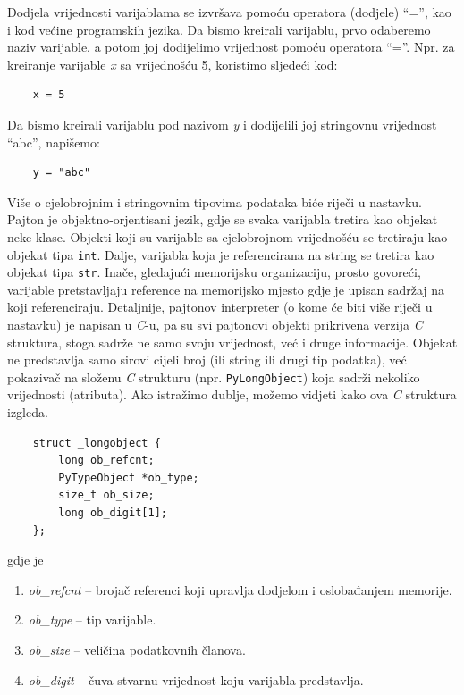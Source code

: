 Dodjela vrijednosti varijablama se izvršava pomoću operatora (dodjele) ``='', kao i kod većine programskih jezika. Da bismo kreirali varijablu, prvo odaberemo naziv varijable, a potom joj dodijelimo vrijednost pomoću operatora ``=''. Npr. za kreiranje varijable \textit{x} sa vrijednošću   5, koristimo sljedeći kod:

\begin{verbatim}
	x = 5
\end{verbatim}

Da bismo kreirali varijablu pod nazivom \textit{y} i dodijelili joj stringovnu vrijednost ``abc'', napišemo:
\begin{verbatim}
	y = "abc"
\end{verbatim}

Više o cjelobrojnim i stringovnim tipovima podataka biće riječi u nastavku. \\ 
 
Pajton je objektno-orjentisani jezik, gdje se svaka varijabla tretira kao objekat neke klase.  
Objekti koji su varijable sa cjelobrojnom vrijednošću se tretiraju kao objekat tipa \texttt{int}. Dalje, varijabla koja je referencirana na string se tretira kao objekat tipa \texttt{str}.  Inače, gledajući memorijsku organizaciju, prosto govoreći, varijable pretstavljaju reference na memorijsko mjesto gdje je upisan sadržaj na koji referenciraju.  
Detaljnije, pajtonov interpreter (o kome će biti više riječi u nastavku) je   napisan u \textit{C}-u, pa su svi pajtonovi objekti prikrivena verzija \textit{C} struktura, stoga  sadrže ne samo svoju vrijednost, već i druge informacije. Objekat ne predstavlja samo sirovi cijeli broj (ili string ili drugi tip podatka), već pokazivač na složenu \textit{C} strukturu (npr. \texttt{PyLongObject}) koja sadrži nekoliko vrijednosti (atributa). Ako istražimo dublje, možemo vidjeti kako ova \textit{C} struktura izgleda.

\begin{verbatim}
	struct _longobject {
		long ob_refcnt;
		PyTypeObject *ob_type;
		size_t ob_size;
		long ob_digit[1];
	};
\end{verbatim}
gdje je
\begin{enumerate}
	\item   \textit{\textit{ob\_refcnt}} -- brojač referenci koji upravlja dodjelom i oslobađanjem memorije.
    \item \textit{ob\_type} -- tip varijable.
    \item  \textit{ob\_size} -- veličina podatkovnih članova.
    \item  \textit{ob\_digit} -- čuva stvarnu vrijednost koju varijabla predstavlja.
\end{enumerate}

